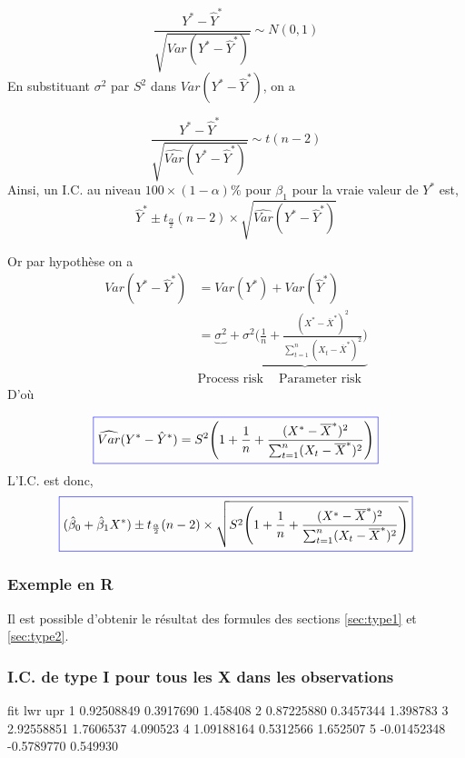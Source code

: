\documentclass[11pt,french]{report}
\begin{document}
$$
\frac{Y^* - \hat{Y}^*}{\sqrt{Var(Y^* - \hat{Y}^*)}} \sim N(0,1)
$$
En substituant $\sigma^2$ par $S^2$ dans $Var(Y^* - \hat{Y}^*)$, on a

$$
\frac{Y^* - \hat{Y}^*}{\sqrt{\widehat{Var}(Y^* - \hat{Y}^*)}} \sim t(n-2)
$$
Ainsi, un I.C. au niveau $100 \times (1 - \alpha)\%$ pour $\beta_1$  pour la vraie valeur de $Y^*$ est,
$$
\hat{Y}^* \pm t_{\frac{\alpha}{2}}(n-2)\times \sqrt{\widehat{Var}(Y^* - \hat{Y}^*)}
$$

Or par hypothèse on a
\begin{align*}
Var(Y^* - \hat{Y}^*) &= Var(Y^*) + Var(\hat{Y}^*) \\
&= \underbrace{\sigma^2} +\underbrace{\sigma^2\big( \frac{1}{n} + \frac{(X^* - \overline{X}^*)^2}{\sum_{t=1}^n (X_t - \overline{X}^*)^2}\big)}  \\
&   \text{Process risk }\ \ \ \  \text{Parameter risk}
\end{align*}
D'où 

\begin{equation}
\label{eq:var2*}
\color{blue}
\boxed{\color{black}
\widehat{Var}(Y^* - \hat{Y}^*) = S^2 \Bigg(1 + \frac{1}{n} + \frac{(X^* - \overline{X}^*)^2}{\sum_{t=1}^n (X_t - \overline{X}^*)^2}\Bigg)  
}
\end{equation}
L'I.C. est donc,
\begin{equation}
\label{eq:IC3}
\color{blue}
\boxed{\color{black}
(\hat{\beta}_0 + \hat{\beta}_1X^*) \pm t_{\frac{\alpha}{2}}(n-2)\times \sqrt{S^2 \Bigg(1 + \frac{1}{n} + \frac{(X^* - \overline{X}^*)^2}{\sum_{t=1}^n (X_t - \overline{X}^*)^2}\Bigg)}  
}
\end{equation}

\subsubsection*{Exemple en R}
Il est possible d'obtenir le résultat des formules des sections \ref{sec:type1} et \ref{sec:type2}.

\subsubsection*{I.C. de type I pour tous les X dans les observations}
\begin{Schunk}
\begin{Soutput}
          fit        lwr      upr
1  0.92508849  0.3917690 1.458408
2  0.87225880  0.3457344 1.398783
3  2.92558851  1.7606537 4.090523
4  1.09188164  0.5312566 1.652507
5 -0.01452348 -0.5789770 0.549930
\end{Soutput}
\end{Schunk}
\end{document}
